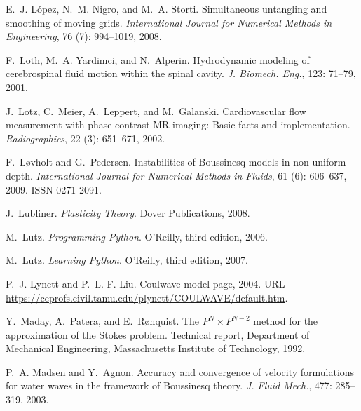 \begin{thebibliography}{467}
E.~J. L\'{o}pez, N.~M. Nigro, and M.~A. Storti.
\newblock Simultaneous untangling and smoothing of moving grids.
\newblock \emph{International Journal for Numerical Methods in Engineering},
  76 (7): 994--1019, 2008.

F.~Loth, M.~A. Yardimci, and N.~Alperin.
\newblock Hydrodynamic modeling of cerebrospinal fluid motion within the spinal
  cavity.
\newblock \emph{J. Biomech. Eng.}, 123: 71--79, 2001.

J.~Lotz, C.~Meier, A.~Leppert, and M.~Galanski.
\newblock Cardiovascular flow measurement with phase-contrast {MR} imaging:
  {B}asic facts and implementation.
\newblock \emph{Radiographics}, 22 (3): 651--671, 2002.

F.~L{\o}vholt and G.~Pedersen.
\newblock Instabilities of {B}oussinesq models in non-uniform depth.
\newblock \emph{International Journal for Numerical Methods in Fluids},
  61 (6): 606--637, 2009.
\newblock ISSN 0271-2091.

J.~Lubliner.
\newblock \emph{Plasticity Theory}.
\newblock Dover Publications, 2008.

M.~Lutz.
\newblock \emph{Programming Python}.
\newblock O'Reilly, third edition, 2006.

M.~Lutz.
\newblock \emph{Learning Python}.
\newblock O'Reilly, third edition, 2007.

P.~J. Lynett and P.~L.-F. Liu.
\newblock Coulwave model page, 2004.
\newblock URL
  \url{https://ceprofs.civil.tamu.edu/plynett/COULWAVE/default.htm}.

Y.~Maday, A.~Patera, and E.~R{\o}nquist.
\newblock The {$P^N \times P^{N-2}$} method for the approximation of the
  {S}tokes problem.
\newblock Technical report, Department of Mechanical Engineering, Massachusetts
  Institute of Technology, 1992.

P.~A. Madsen and Y.~Agnon.
\newblock Accuracy and convergence of velocity formulations for water waves in
  the framework of {B}oussinesq theory.
\newblock \emph{J. Fluid Mech.}, 477: 285--319, 2003.


\end{thebibliography}
